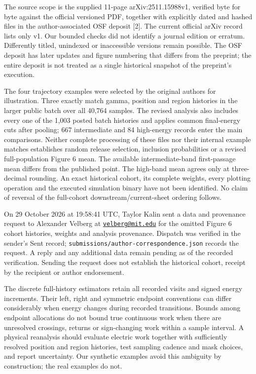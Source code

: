 The source scope is the supplied 11-page arXiv:2511.15988v1, verified
byte for byte against the official versioned PDF, together with
explicitly dated and hashed files in the author-associated OSF deposit
{[}2{]}. The current official arXiv record lists only v1. Our bounded
checks did not identify a journal edition or erratum. Differently
titled, unindexed or inaccessible versions remain possible. The OSF
deposit has later updates and figure numbering that differs from the
preprint; the entire deposit is not treated as a single historical
snapshot of the preprint's execution.

The four trajectory examples were selected by the original authors for
illustration. Three exactly match gamma, position and region histories
in the larger public batch over all 40,764 samples. The revised analysis
also includes every one of the 1,003 posted batch histories and applies
common final-energy cuts after pooling; 667 intermediate and 84
high-energy records enter the main comparisons. Neither complete
processing of these files nor their internal example matches establishes
random release selection, inclusion probabilities or a revised
full-population Figure 6 mean. The available intermediate-band
first-passage mean differs from the published point. The high-band mean
agrees only at three-decimal rounding. An exact historical cohort, its
complete weights, every plotting operation and the executed simulation
binary have not been identified. No claim of reversal of the full-cohort
downstream/current-sheet ordering follows.

On 29 October 2026 at 19:58:41 UTC, Taylor Kalin sent a data and
provenance request to Alexander Velberg at
\href{mailto:velberg@mit.edu}{\nolinkurl{velberg@mit.edu}} for the
omitted Figure 6 cohort histories, weights and analysis provenance.
Dispatch was verified in the sender's Sent record;
\nolinkurl{submissions/author-correspondence.json} records the request. A
reply and any additional data remain pending as of the recorded
verification. Sending the request does not establish the historical
cohort, receipt by the recipient or author endorsement.

The discrete full-history estimators retain all recorded visits and
signed energy increments. Their left, right and symmetric endpoint
conventions can differ considerably when energy changes during recorded
transitions. Bounds among endpoint allocations do not bound true
continuous work when there are unresolved crossings, returns or
sign-changing work within a sample interval. A physical reanalysis
should evaluate electric work together with sufficiently resolved
position and region histories, test sampling cadence and mask choices,
and report uncertainty. Our synthetic examples avoid this ambiguity by
construction; the real examples do not.

